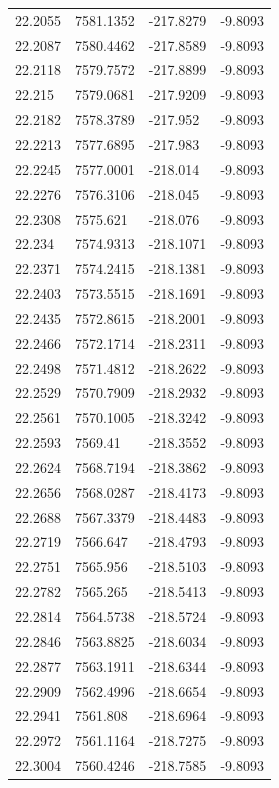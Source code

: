 \begin{table}[H]
\begin{tabular}{llll}
22.2055 & 7581.1352 & -217.8279 & -9.8093 \\
22.2087 & 7580.4462 & -217.8589 & -9.8093 \\
22.2118 & 7579.7572 & -217.8899 & -9.8093 \\
22.215 & 7579.0681 & -217.9209 & -9.8093 \\
22.2182 & 7578.3789 & -217.952 & -9.8093 \\
22.2213 & 7577.6895 & -217.983 & -9.8093 \\
22.2245 & 7577.0001 & -218.014 & -9.8093 \\
22.2276 & 7576.3106 & -218.045 & -9.8093 \\
22.2308 & 7575.621 & -218.076 & -9.8093 \\
22.234 & 7574.9313 & -218.1071 & -9.8093 \\
22.2371 & 7574.2415 & -218.1381 & -9.8093 \\
22.2403 & 7573.5515 & -218.1691 & -9.8093 \\
22.2435 & 7572.8615 & -218.2001 & -9.8093 \\
22.2466 & 7572.1714 & -218.2311 & -9.8093 \\
22.2498 & 7571.4812 & -218.2622 & -9.8093 \\
22.2529 & 7570.7909 & -218.2932 & -9.8093 \\
22.2561 & 7570.1005 & -218.3242 & -9.8093 \\
22.2593 & 7569.41 & -218.3552 & -9.8093 \\
22.2624 & 7568.7194 & -218.3862 & -9.8093 \\
22.2656 & 7568.0287 & -218.4173 & -9.8093 \\
22.2688 & 7567.3379 & -218.4483 & -9.8093 \\
22.2719 & 7566.647 & -218.4793 & -9.8093 \\
22.2751 & 7565.956 & -218.5103 & -9.8093 \\
22.2782 & 7565.265 & -218.5413 & -9.8093 \\
22.2814 & 7564.5738 & -218.5724 & -9.8093 \\
22.2846 & 7563.8825 & -218.6034 & -9.8093 \\
22.2877 & 7563.1911 & -218.6344 & -9.8093 \\
22.2909 & 7562.4996 & -218.6654 & -9.8093 \\
22.2941 & 7561.808 & -218.6964 & -9.8093 \\
22.2972 & 7561.1164 & -218.7275 & -9.8093 \\
22.3004 & 7560.4246 & -218.7585 & -9.8093 \\

\end{tabular}
\end{table}
